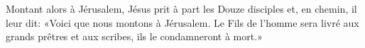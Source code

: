 Montant alors à Jérusalem,
	Jésus prit à part les Douze disciples et, en chemin, il leur dit:
«Voici que nous montons à Jérusalem.
	Le Fils de l’homme sera livré aux grands prêtres et aux scribes,
	ils le condamneront à mort.»
